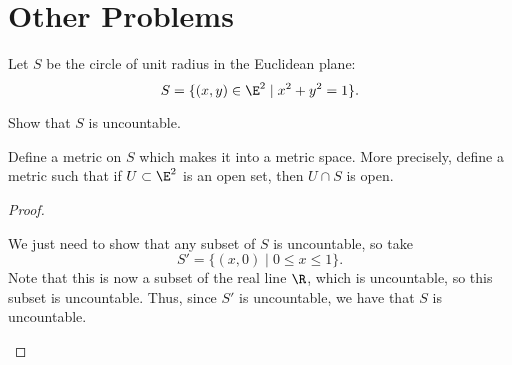 \documentclass{assignment}
\begin{document}
\section*{Other Problems}
\begin{question}[1]
  Let $S$ be the circle of unit radius in the Euclidean plane: 
$$S = \{(x,y)\in\E^2\mid x^2 + y^2 = 1\}.$$
\begin{qparts}
\item Show that $S$ is uncountable.
\item Define a metric on $S$ which makes it into a metric space. More precisely, define a metric such
that if $U\subset\E^2$ is an open set, then $U\cap S$ is open.
\end{qparts}
\end{question}
\begin{proof}
  \begin{qparts}
  \item We just need to show that any subset of $S$ is uncountable, so take $$S' = \{(x, 0) \mid 0\leq x
    \leq 1 \}.$$ Note that this is now a subset of the real line $\R$, which is uncountable, so this
    subset is uncountable. Thus, since $S'$ is uncountable, we have that $S$ is uncountable.
  \item 
  \end{qparts}
\end{proof}
\end{document}

